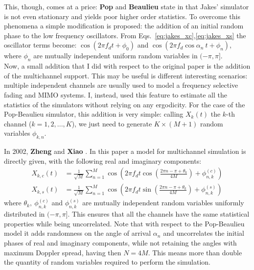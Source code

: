 This, though, comes at a price: \textbf{Pop} and \textbf{Beaulieu} state in \cite{A1} that Jakes' simulator is not even stationary and yields poor higher order statistics. To overcome this phenomena a simple modification is proposed: the addition of an initial random phase to the low frequency oscillators. From Eqs.~\ref{eq:jakes_xc},\ref{eq:jakes_xs} the oscillator terms become: $\cos(2\pi f_d t + \phi_0)$ and $\cos( 2\pi f_d \cos \alpha_n \ t + \phi_n)$, where $\phi_n$ are mutually independent uniform random variables in $(-\pi,\pi]$.\\
Now, a small addition that I did with respect to the original paper is the addition of the multichannel support. This may be useful is different interesting scenarios: multiple independent channels are usually used to model a frequency selective fading and MIMO systems. I, instead, used this feature to estimate all the statistics of the simulators without relying on any ergodicity. For the case of the Pop-Beaulieu simulator, this addition is very simple: calling $X_k(t)$ the $k$-th channel ($k=1,2,...,K$), we just need to generate $K \times(M+1)$ random variables $\phi_{k,n}$.

In 2002, \textbf{Zheng} and \textbf{Xiao} \cite{C2}. In this paper a model for multichannel simulation is directly given, with the following real and imaginary components:%
%
\begin{subequations}
\begin{align}
X_{k,c}(t) &= \frac{1}{\sqrt{M}} \sum_{n=1}^{M} \cos \left( 2\pi f_d t \cos \left( \frac{2\pi n - \pi + \theta_k}{4M}\right) + \phi_{n,k}^{(c)} \right)\\
X_{k,s}(t) &= \frac{1}{\sqrt{M}} \sum_{n=1}^{M} \cos \left( 2\pi f_d t \sin \left( \frac{2\pi n - \pi + \theta_k}{4M}\right) + \phi_{n,k}^{(s)} \right)
\end{align}
\end{subequations}%
%
where $\theta_k, \ \phi_{n,k}^{(c)}$ and $\phi_{n,k}^{(s)}$ are mutually independent random variables uniformly distributed in $(-\pi,\pi]$. This ensures that all the channels have the same statistical properties while being uncorrelated. Note that with respect to the Pop-Beaulieu model it adds randomness on the angle of arrival $\alpha_n$ and uncorrelates the initial phases of real and imaginary components, while not retaining the angles with maximum Doppler spread, having then $N=4M$. This means more than double the quantity of random variables required to perform the simulation.

